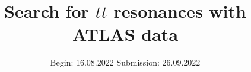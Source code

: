 


\title{Search for $t\bar{t}$ resonances with ATLAS data}
\date{%
  Begin: 16.08.2022
  \hspace{3em}
  Submission:  26.09.2022
}



\maketitle
\thispagestyle{empty}
\tableofcontents
\newpage






\printbibliography[title={Literature}]{}


